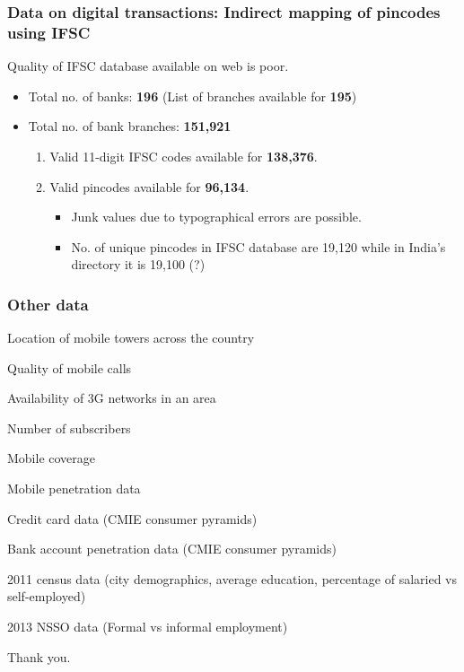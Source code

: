 \documentclass{beamer}\usepackage[]{graphicx}\usepackage[]{color}
\begin{document}
\begin{frame}
  \frametitle{Data on digital transactions: Indirect mapping of pincodes using IFSC}
  \begin{footnotesize}
    Quality of IFSC database available on web is poor.
    \begin{itemize}
    \item Total no. of banks: \textbf{196} (List of branches available for \textbf{195})
    \item Total no. of bank branches: \textbf{151,921} 
      \begin{enumerate}
      \item Valid 11-digit IFSC codes available for \textbf{138,376}.
      \item Valid pincodes available for \textbf{96,134}.
        \begin{itemize}
        \item Junk values due to typographical errors are possible.
        \item No. of unique pincodes in IFSC database are 19,120 while in India's directory it is 19,100 (?)  
        \end{itemize}
      \end{enumerate}  
    \end{itemize}
  \end{footnotesize}
\end{frame}

\begin{frame}
  \frametitle{Other data}
  \begin{enumerate}
    \begin{footnotesize}
    \item Location of mobile towers across the country
    \item Quality of mobile calls
    \item Availability of 3G networks in an area
    \item Number of subscribers
    \item Mobile coverage
    \item Mobile penetration data
    \item Credit card data (CMIE consumer pyramids)
    \item Bank account penetration data (CMIE consumer pyramids)
    \item 2011 census data (city demographics, average education, percentage of salaried vs self-employed)
    \item 2013 NSSO data (Formal vs informal employment)
    \end{footnotesize}
  \end{enumerate}
\end{frame}


\begin{frame}
  \begin{center}
    Thank you.
    \vspace{0.1in}
  \end{center}
\end{frame}
\end{document}
